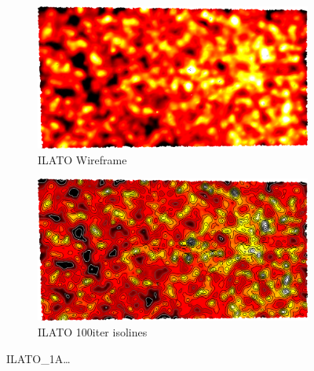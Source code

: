 \begin{figure}[ht]
{	\bigskip
	\begin{subfigure}[b]{0.48\linewidth}
		\includegraphics[width=1.0\linewidth,height=0.3\textheight,keepaspectratio]{data/acquired_meshes/ILATO_1A_SM2066-HE5-60_070214_merged_GMO_r1_n4_v256_funcvals_3000iter.png}
		\caption{ILATO Wireframe}\label{fig:ILATO.e}
	\end{subfigure}
	\begin{subfigure}[b]{0.48\linewidth}
		\includegraphics[width=1.0\linewidth,height=0.3\textheight,keepaspectratio]{data/acquired_meshes/ILATO_1A_SM2066-HE5-60_070214_merged_GMO_r1_n4_v256_funcvals_isolines_3000iter.png}
		\caption{ILATO 100iter isolines}\label{fig:ILATO.f}
	\end{subfigure}}
	{\caption[ILATO]{ILATO\_1A\ldots}\label{fig:ILATO}}
\end{figure}

